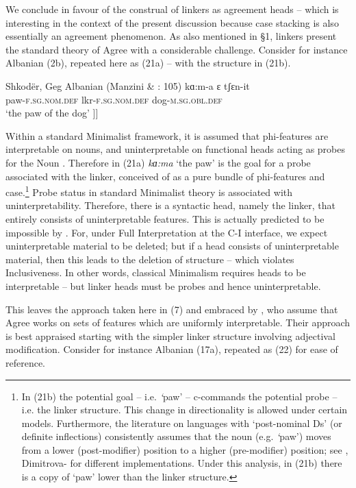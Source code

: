 \documentclass[output=paper]{langsci/langscibook}
\begin{document}
  We conclude in favour of the construal of linkers as agreement heads – which is interesting in the context of the present discussion because case stacking is also essentially an agreement phenomenon. As also mentioned in §1, linkers present the standard theory of Agree with a considerable challenge. Consider for instance Albanian (2b), repeated here as (21a) – with the structure in (21b).

\ea%
    \label{ex:manzini:21}
    \ea Shkodër, Geg Albanian (Manzini \& \citealt{Savoia2011b}: 105)
    \gll kɑ:m-a      ɛ          tʃɛn-it          \\
         paw-\textsc{f.sg.nom.def}   lkr-\textsc{f.sg.nom.def}  dog-\textsc{m.sg.obl.def} \\
    \glt ‘the paw of the dog’
    \ex\relax [\textsubscript{DP} kɑ:ma    [\textsubscript{Lkr} ɛ  [\textsubscript{DP} tʃɛnit ]]] 
    \z
\z{}

 Within a standard Minimalist framework, it is assumed that phi-features are interpretable on nouns, and uninterpretable on functional heads acting as probes for the Noun \citep{Carstens2001}. Therefore in (21a) \textit{kɑ:ma} ‘the paw’ is the goal for a probe associated with the linker, conceived of as a pure bundle of phi-features and case.\footnote{In (21b) the potential goal – i.e. \textit{‘}paw’ – c-commands the potential probe – i.e. the linker structure. This change in directionality is allowed under certain models. Furthermore, the literature on languages with ‘post-nominal Ds’ (or definite inflections) consistently assumes that the noun (e.g. \textit{‘}paw’) moves from a lower (post-modifier) position to a higher (pre-modifier) position; see \citet{Turano2002}, Dimitrova-\citet{Vulchanova1998} for different implementations. Under this analysis, in (21b) there is a copy of ‘paw’ lower than the linker structure.} Probe status in standard Minimalist theory is associated with uninterpretability. Therefore, there is a syntactic head, namely the linker, that entirely consists of uninterpretable features. This is actually predicted to be impossible by \citet{Chomsky1995}. For, under Full Interpretation at the C-I interface, we expect uninterpretable material to be deleted; but if a head consists of uninterpretable material, then this leads to the deletion of structure – which violates Inclusiveness. In other words, classical Minimalism requires heads to be interpretable – but linker heads must be probes and hence uninterpretable. 

  This leaves the approach taken here in (7) and embraced by \citet{FrancoEtAl2015}, who assume that Agree works on sets of features which are uniformly interpretable. Their approach is best appraised starting with the simpler linker structure involving adjectival modification. Consider for instance Albanian (17a), repeated as (22) for ease of reference. 
\end{document}
